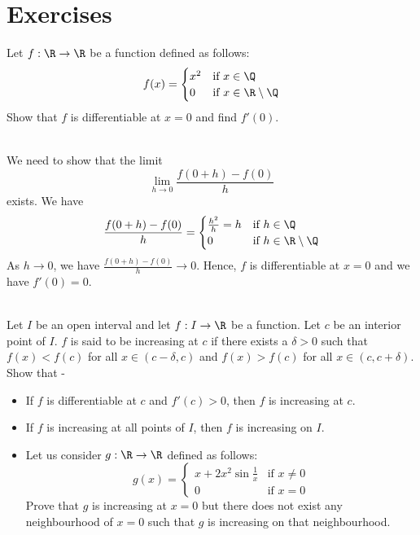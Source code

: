 \documentclass[openany]{book}
\begin{document}
\section{Exercises}
\begin{exercise}
    Let $f: \R \to \R$ be a function defined as follows:
    \[ f(x) = \begin{cases}
    x^2 & \text{if } x \in \Q \\
    0 & \text{if } x \in \R \setminus \Q
    \end{cases}
    \]
    Show that $f$ is differentiable at $x = 0$ and find $f'(0)$.
\end{exercise} \\
 We need to show that the limit \[
    \lim_{h \to 0} \frac{f(0 + h) - f(0)}{h}
\]
exists. We have
\[
    \frac{f(0 + h) - f(0)}{h} = \begin{cases}
    \frac{h^2}{h} = h & \text{if } h \in \Q \\
    0 & \text{if } h \in \R \setminus \Q
    \end{cases}
\]
As $h \to 0$, we have $\frac{f(0 + h) - f(0)}{h} \to 0$. Hence, $f$ is differentiable at $x = 0$ and we have $f'(0) = 0$. \\ \\
\begin{exercise}
    Let $I$ be an open interval and let $f: I \to \R$ be a function. Let $c$ be an interior point of $I$. $f$ is said to be increasing at $c$ if there exists a $\delta > 0$ such that $f(x) < f(c)$ for all $x \in (c - \delta, c)$ and $f(x) > f(c)$ for all $x \in (c, c + \delta)$. Show that -
    \begin{itemize}
        \item If $f$ is differentiable at $c$ and $f'(c) > 0$, then $f$ is increasing at $c$.
        \item If $f$ is increasing at all points of $I$, then $f$ is increasing on $I$.
        \item Let us consider $g: \R \to \R$ defined as follows:
        \[
            g(x) = \begin{cases}
            x + 2x^2 \sin{\frac{1}{x}} & \text{if } x \neq 0 \\
            0 & \text{if } x =0
            \end{cases}
        \]
        Prove that $g$ is increasing at $x = 0$ but there does not exist any neighbourhood of $x = 0$ such that $g$ is increasing on that neighbourhood.
    \end{itemize}
\end{exercise} 
\end{document}
